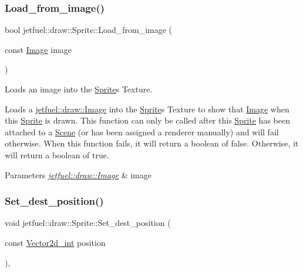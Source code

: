 \subsubsection{\texorpdfstring{Load\+\_\+from\+\_\+image()}{Load\_from\_image()}}
{\footnotesize\ttfamily bool jetfuel\+::draw\+::\+Sprite\+::\+Load\+\_\+from\+\_\+image (\begin{DoxyParamCaption}\item[{const \hyperlink{classjetfuel_1_1draw_1_1Image}{Image}}]{image }\end{DoxyParamCaption})}



Loads an image into the \hyperlink{classjetfuel_1_1draw_1_1Sprite}{Sprite}\textquotesingle{}s Texture. 

Loads a \hyperlink{classjetfuel_1_1draw_1_1Image}{jetfuel\+::draw\+::\+Image} into the \hyperlink{classjetfuel_1_1draw_1_1Sprite}{Sprite}\textquotesingle{}s Texture to show that \hyperlink{classjetfuel_1_1draw_1_1Image}{Image} when this \hyperlink{classjetfuel_1_1draw_1_1Sprite}{Sprite} is drawn. This function can only be called after this \hyperlink{classjetfuel_1_1draw_1_1Sprite}{Sprite} has been attached to a \hyperlink{classjetfuel_1_1draw_1_1Scene}{Scene} (or has been assigned a renderer manually) and will fail otherwise. When this function fails, it will return a boolean of false. Otherwise, it will return a boolean of true.


\begin{DoxyParams}{Parameters}
{\em \hyperlink{classjetfuel_1_1draw_1_1Image}{jetfuel\+::draw\+::\+Image}} & image \\
\hline
\end{DoxyParams}
\mbox{\label{classjetfuel_1_1draw_1_1Sprite_a58a61883d32073cd96d70c2cd6025534}} 
\subsubsection{\texorpdfstring{Set\+\_\+dest\+\_\+position()}{Set\_dest\_position()}}
{\footnotesize\ttfamily void jetfuel\+::draw\+::\+Sprite\+::\+Set\+\_\+dest\+\_\+position (\begin{DoxyParamCaption}\item[{const \hyperlink{classjetfuel_1_1draw_1_1Vector2d}{Vector2d\+\_\+int}}]{position }\end{DoxyParamCaption})\hspace{0.3cm}{\ttfamily [inline]}, {\ttfamily [protected]}}



